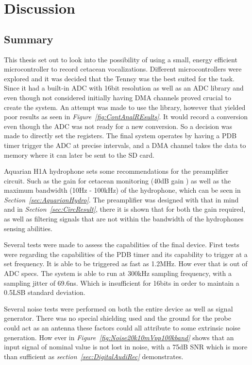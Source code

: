 \chapter{Discussion}








\section{Summary}

This thesis set out to look into the possibility of using a small, energy efficient microcontroller to record cetacean vocalizations.
Different microcontrollers were explored and it was decided that the Tennsy was the best suited for the task.
Since it had a built-in ADC with 16bit resolution as well as an ADC library and even though not considered initially having DMA channels proved crucial to create the system.
An attempt was made to use the library, however that yielded poor results as seen in \textit{Figure~\ref{fig:ContAnalREsults}}. 
It would record a conversion even though the ADC was not ready for a new conversion.
So a decision was made to directly set the registers.
The final system operates by having a PDB timer trigger the ADC at precise intervals, and a DMA channel takes the data to memory where it can later be sent to the SD card.

Aquarian H1A hydrophone sets some recommendations for the preamplifier circuit. 
Such as the gain for cetacean monitoring (40dB gain ) as well as the maximum bandwidth (10Hz - 100kHz) of the hydrophone, which can be seen in \textit{Section~\ref{sec:AquarionHydro}}.
The preamplifier was designed with that in mind and in \textit{Section~\ref{sec:CircResult}}, there it is shown that for both the gain required, as well as filtering signals that are not within the bandwidth of the hydrophones sensing abilities.

Several tests were made to assess the capabilities of the final device.
First tests were regarding the capabilities of the PDB timer and its capability to trigger at a set frequency.
It is able to be triggered as fast as 1.2MHz.
How ever that is out of ADC specs.
The system is able to run at 300kHz sampling frequency, with a sampling jitter of 69.6ns.
Which is insufficient for 16bits  in order to maintain a 0.5LSB standard deviation.

Several noise tests were performed on both the entire device as well as signal generator.
There was no special shielding used and the ground for the probe could act as an antenna these factors could all attribute to some extrinsic noise generation.
How ever in \textit{Figure~\ref{fig:Noise20k10mVpp100kband}} shows that an input signal of nominal value is not lost in noise, with a 75dB SNR which is more than sufficient as \textit{section~\ref{sec:DigitalAudiRec}} demonstrates.

